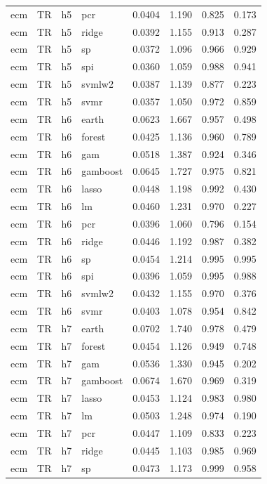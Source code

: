 \begin{ThreePartTable}
\begin{longtable}[t]{llclcccc}
ecm & TR & h5 & pcr & 0.0404 & 1.190 & 0.825 & 0.173\\
ecm & TR & h5 & ridge & 0.0392 & 1.155 & 0.913 & 0.287\\
ecm & TR & h5 & sp & 0.0372 & 1.096 & 0.966 & 0.929\\
ecm & TR & h5 & spi & 0.0360 & 1.059 & 0.988 & 0.941\\
ecm & TR & h5 & svmlw2 & 0.0387 & 1.139 & 0.877 & 0.223\\
ecm & TR & h5 & svmr & 0.0357 & 1.050 & 0.972 & 0.859\\
\addlinespace
ecm & TR & h6 & earth & 0.0623 & 1.667 & 0.957 & 0.498\\
ecm & TR & h6 & forest & 0.0425 & 1.136 & 0.960 & 0.789\\
ecm & TR & h6 & gam & 0.0518 & 1.387 & 0.924 & 0.346\\
ecm & TR & h6 & gamboost & 0.0645 & 1.727 & 0.975 & 0.821\\
ecm & TR & h6 & lasso & 0.0448 & 1.198 & 0.992 & 0.430\\
ecm & TR & h6 & lm & 0.0460 & 1.231 & 0.970 & 0.227\\
ecm & TR & h6 & pcr & 0.0396 & 1.060 & 0.796 & 0.154\\
ecm & TR & h6 & ridge & 0.0446 & 1.192 & 0.987 & 0.382\\
ecm & TR & h6 & sp & 0.0454 & 1.214 & 0.995 & 0.995\\
ecm & TR & h6 & spi & 0.0396 & 1.059 & 0.995 & 0.988\\
ecm & TR & h6 & svmlw2 & 0.0432 & 1.155 & 0.970 & 0.376\\
ecm & TR & h6 & svmr & 0.0403 & 1.078 & 0.954 & 0.842\\
\addlinespace
ecm & TR & h7 & earth & 0.0702 & 1.740 & 0.978 & 0.479\\
ecm & TR & h7 & forest & 0.0454 & 1.126 & 0.949 & 0.748\\
ecm & TR & h7 & gam & 0.0536 & 1.330 & 0.945 & 0.202\\
ecm & TR & h7 & gamboost & 0.0674 & 1.670 & 0.969 & 0.319\\
ecm & TR & h7 & lasso & 0.0453 & 1.124 & 0.983 & 0.980\\
ecm & TR & h7 & lm & 0.0503 & 1.248 & 0.974 & 0.190\\
ecm & TR & h7 & pcr & 0.0447 & 1.109 & 0.833 & 0.223\\
ecm & TR & h7 & ridge & 0.0445 & 1.103 & 0.985 & 0.969\\
ecm & TR & h7 & sp & 0.0473 & 1.173 & 0.999 & 0.958\\

\end{longtable}
\end{ThreePartTable}
